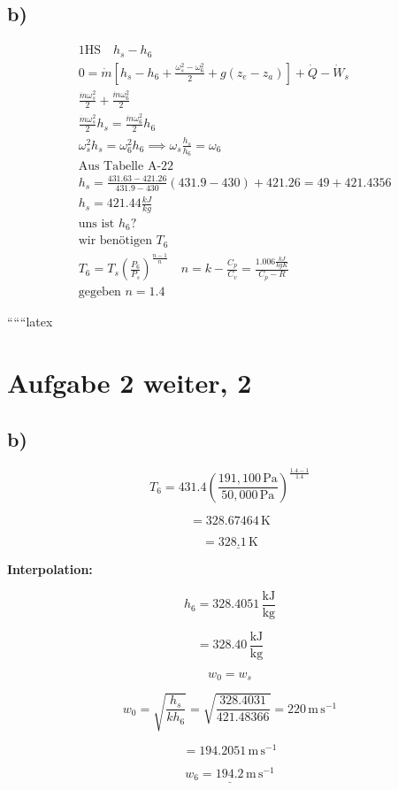

\subsection*{b)}

\begin{align*}
    &\text{1HS} \quad h_s - h_6 \\
    &0 = \dot{m} \left[ h_s - h_6 + \frac{\omega_s^2 - \omega_6^2}{2} + g(z_e - z_a) \right] + \dot{Q} - \dot{W}_s \\
    &\frac{\dot{m} \omega_s^2}{2} + \frac{\dot{m} \omega_6^2}{2} \\
    &\frac{\dot{m} \omega_s^2}{2} h_s = \frac{\dot{m} \omega_6^2}{2} h_6 \\
    &\omega_s^2 h_s = \omega_6^2 h_6 \implies \omega_s \frac{h_s}{h_6} = \omega_6 \\
    &\text{Aus Tabelle A-22} \\
    &h_s = \frac{431.63 - 421.26}{431.9 - 430} (431.9 - 430) + 421.26 = 49 + 421.4356 \\
    &h_s = 421.44 \frac{kJ}{kg} \\
    &\text{uns ist } h_6? \\
    &\text{wir benötigen } T_6 \\
    &T_6 = T_s \left( \frac{P_6}{P_s} \right)^{\frac{n-1}{n}} \quad n = k - \frac{C_p}{C_v} = \frac{1.006 \frac{kJ}{kgK}}{C_p - R} \\
    &\text{gegeben } n = 1.4
\end{align*}

``````latex


\section*{Aufgabe 2 weiter, 2}



\subsection*{b)}

\[
T_6 = 431.4 \left( \frac{191,100 \, \text{Pa}}{50,000 \, \text{Pa}} \right)^{\frac{1.4 - 1}{1.4}}
\]

\[
= 328.67464 \, \text{K}
\]

\[
= \underline{328.1 \, \text{K}}
\]

\textbf{Interpolation:}

\[
h_6 = 328.4051 \, \frac{\text{kJ}}{\text{kg}}
\]

\[
= 328.40 \, \frac{\text{kJ}}{\text{kg}}
\]

\[
w_0 = w_s
\]

\[
w_0 = \sqrt{\frac{h_s}{k h_6}} = \sqrt{\frac{328.4031}{421.48366}} = 220 \, \text{m} \, \text{s}^{-1}
\]

\[
= 194.2051 \, \text{m} \, \text{s}^{-1}
\]

\[
\underline{w_6 = 194.2 \, \text{m} \, \text{s}^{-1}}
\]
